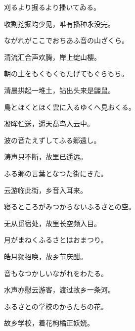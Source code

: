 \begin{haiku}
    {\FH 刈るより掘るより播いてゐる。}

    {\FK 收割挖掘均少见，唯有播种永没完。}
\end{haiku}

\begin{haiku}
    {\FH ながれがここでおちあふ音の山ざくら。}

    {\FK 清流汇合声欢腾，岸上绽山樱。}
\end{haiku}

\begin{haiku}
    {\FH 朝の土をもくもくもたげてもぐらもち。}

    {\FK 清晨拱起一堆土，钻出头来是鼹鼠。}
\end{haiku}

\begin{haiku}
    {\FH 鳥とほくとほく雲に入るゆくへ見おくる。}

    {\FK 凝眸伫送，遥天髙鸟入云中。}
\end{haiku}

\begin{haiku}
    {\FH 波の音たえずしてふる郷遠し。}

    {\FK 涛声只不断，故里已遥远。}
\end{haiku}

\begin{haiku}
    {\FH ふる郷の言葉となつた街にきた。}

    {\FK 云游临此街，乡音入耳来。}
\end{haiku}

\begin{haiku}
    {\FH 寝るところがみつからないふるさとの空。}

    {\FK 无从觅宿处，故里长空频入目。}
\end{haiku}

\begin{haiku}
    {\FH 月がまねくふるさとはおまつり。}

    {\FK 皓月频招唤，故乡节庆酣。}
\end{haiku}

\begin{haiku}
    {\FH 音もなつかしいながれをわたる。}

    {\FK 水声亦慰云游客，渡过故乡一条河。}
\end{haiku}

\begin{haiku}
    {\FH ふるさとの学校のからたちの花。}

    {\FK 故乡学校，着花枸橘正妖娆。}
\end{haiku}

